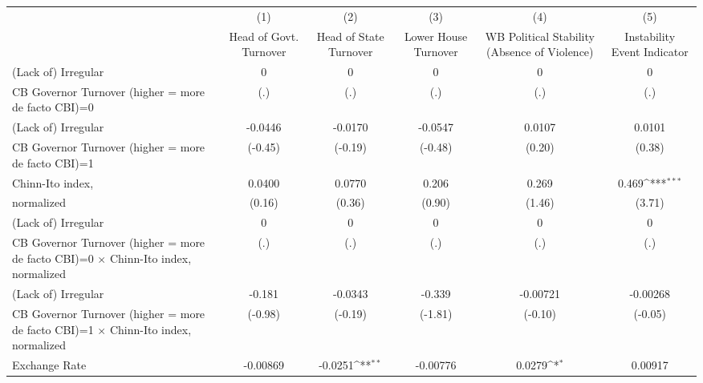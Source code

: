 {
\def\sym#1{\ifmmode^{#1}\else\(^{#1}\)\fi}
\begin{tabular}{l*{5}{c}}
\hline\hline
                    &\multicolumn{1}{c}{(1)}&\multicolumn{1}{c}{(2)}&\multicolumn{1}{c}{(3)}&\multicolumn{1}{c}{(4)}&\multicolumn{1}{c}{(5)}\\
                    &\multicolumn{1}{c}{Head of Govt. Turnover}&\multicolumn{1}{c}{Head of State Turnover}&\multicolumn{1}{c}{Lower House Turnover}&\multicolumn{1}{c}{WB Political Stability (Absence of Violence)}&\multicolumn{1}{c}{Instability Event Indicator}\\
\hline
(Lack of) Irregular &           0         &           0         &           0         &           0         &           0         \\
CB Governor Turnover (higher = more de facto CBI)=0&         (.)         &         (.)         &         (.)         &         (.)         &         (.)         \\
[1em]
(Lack of) Irregular &     -0.0446         &     -0.0170         &     -0.0547         &      0.0107         &      0.0101         \\
CB Governor Turnover (higher = more de facto CBI)=1&     (-0.45)         &     (-0.19)         &     (-0.48)         &      (0.20)         &      (0.38)         \\
[1em]
Chinn-Ito index,    &      0.0400         &      0.0770         &       0.206         &       0.269         &       0.469\sym{***}\\
normalized          &      (0.16)         &      (0.36)         &      (0.90)         &      (1.46)         &      (3.71)         \\
[1em]
(Lack of) Irregular &           0         &           0         &           0         &           0         &           0         \\
CB Governor Turnover (higher = more de facto CBI)=0 $\times$ Chinn-Ito index, normalized&         (.)         &         (.)         &         (.)         &         (.)         &         (.)         \\
[1em]
(Lack of) Irregular &      -0.181         &     -0.0343         &      -0.339         &    -0.00721         &    -0.00268         \\
CB Governor Turnover (higher = more de facto CBI)=1 $\times$ Chinn-Ito index, normalized&     (-0.98)         &     (-0.19)         &     (-1.81)         &     (-0.10)         &     (-0.05)         \\
[1em]
Exchange Rate       &    -0.00869         &     -0.0251\sym{**} &    -0.00776         &      0.0279\sym{*}  &     0.00917         \\

\end{tabular}}
